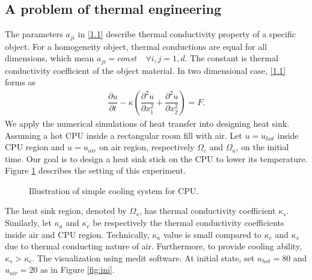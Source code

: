 \subsection{A problem of thermal engineering}
\quad The parameters $a_{ji}$ in \eqref{1.1} describe thermal conductivity property of a specific object. For a homogeneity object, thermal conductions are equal for all dimensions, which mean $a_{ji}=const \quad \forall i,j=\overline{1,d}$. The constant is thermal conductivity coefficient of the object material. In two dimensional case, \eqref{1.1} forms as
\begin{align}\label{4.2}
	\dfrac{\partial u}{\partial t} - \kappa \left(\dfrac{\partial^2 u}{\partial x_1^2}+\dfrac{\partial^2 u}{\partial x_2^2}\right) = F.
\end{align}
\quad We apply the numerical simulations of heat transfer into designing heat sink. Assuming a hot CPU inside a rectangular room fill with air. Let $u=u_{hot}$ inside CPU region and $u=u_{air}$ on air region, respectively $\Omega_{c}$ and $\Omega_{a}$, on the initial time. Our goal is to design a heat sink stick on the CPU to lower its temperature. Figure \ref{fig:testsink} describes the setting of this experiment.\\
\begin{figure}[ht]
	\centering
	\caption{Illustration of simple cooling system for CPU.}
	\label{fig:testsink}
\end{figure}
\newpage
The heat sink region, denoted by $\Omega_{s}$, has thermal conductivity coefficient $\kappa_s$. Similarly, let $\kappa_a$ and $\kappa_c$ be respectively the thermal conductivity coefficients inside air and CPU region. Technically, $\kappa_a$ value is small compared to $\kappa_c$ and $\kappa_s$ due to thermal conducting nature of air. Furthermore, to provide cooling ability, $\kappa_s>\kappa_c$. The visualization using medit software. At initial state, set $u_{hot}=80$ and $u_{air}=20$ as in Figure \ref{fig:ini}.\\
